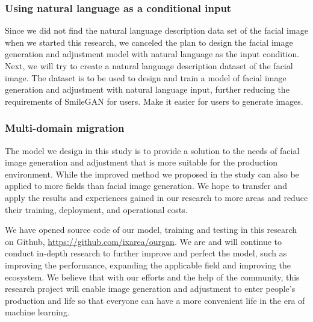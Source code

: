 \subsubsection*{Using natural language as a conditional input}
Since we did not find the natural language description data set of the facial image when we started this research, we canceled the plan to design the facial image generation and adjustment model with natural language as the input condition.
Next, we will try to create a natural language description dataset of the facial image.
The dataset is to be used to design and train a model of facial image generation and adjustment with natural language input, further reducing the requirements of SmileGAN for users.
Make it easier for users to generate images.
\subsubsection*{Multi-domain migration}
The model we design in this study is to provide a solution to the needs of facial image generation and adjustment that is more suitable for the production environment.
While the improved method we proposed in the study can also be applied to more fields than facial image generation.
We hope to transfer and apply the results and experiences gained in our research to more areas and reduce their training, deployment, and operational costs.

\vspace{4ex}

We have opened source code of our model, training and testing in this research on Github, \url{https://github.com/ixarea/ourgan}.
We are and will continue to conduct in-depth research to further improve and perfect the model,
    such as improving the performance, expanding the applicable field and improving the ecosystem.
We believe that with our efforts and the help of the community,
    this research project will enable image generation and adjustment to enter people's production and life
    so that everyone can have a more convenient life in the era of machine learning.







